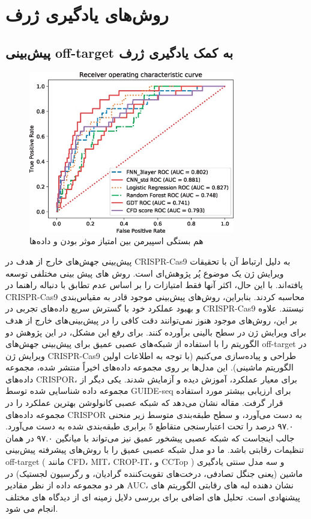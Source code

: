 \documentclass[12pt,a4paper,BCOR=.7cm,headsepline,bibliography=totoc]{report}
\begin{document}
\section{روش‌های یادگیری ژرف}
\subsection{پیش‌بینی off-target به کمک یادگیری ژرف}
\begin{figure}
\centering
\includegraphics[width=9cm, ]{pictures/DeepLearning.jpg}
\caption{
هم بستگی اسپیرمن بین امتیاز موثر بودن و داده‌ها ~\cite{chart}
}\label{wrap-fig:4}
\end{figure}
پیش‌بینی جهش‌های خارج از هدف در CRISPR-Cas9 به دلیل ارتباط آن با تحقیقات ویرایش ژن یک موضوع پُر پژوهش‌ای است. روش های پیش بینی مختلفی توسعه یافته‌اند. با این حال، اکثر آنها فقط امتیازات را بر اساس عدم تطابق با دنباله راهنما در CRISPR-Cas9 محاسبه کردند. بنابراین، روش‌های پیش‌بینی موجود قادر به مقیاس‌بندی و بهبود عملکرد خود با گسترش سریع داده‌های تجربی در CRISPR-Cas9 نیستند. علاوه بر این، روش‌های موجود هنوز نمی‌توانند دقت کافی را در پیش‌بینی‌های خارج از هدف برای ویرایش ژن در سطح بالینی برآورده کنند. برای رفع این مشکل، در این پژوهش دو الگوریتم را با استفاده از شبکه‌های عصبی عمیق برای پیش‌بینی جهش‌های off-target در ویرایش ژن CRISPR-Cas9 طراحی و پیاده‌سازی می‌کنیم (با توجه به اطلاعات اولین الگوریتم ماشینی). این مدل‌ها بر روی مجموعه داده‌های اخیراً منتشر شده، مجموعه داده‌های CRISPOR، برای معیار عملکرد، آموزش دیده و آزمایش شدند. یکی دیگر از مجموعه داده شناسایی شده توسط GUIDE-seq برای ارزیابی بیشتر مورد استفاده قرار گرفت. مقاله نشان می‌دهد که شبکه عصبی کانولوشن بهترین عملکرد را در مجموعه داده‌های CRISPOR به دست می‌آورد، و سطح طبقه‌بندی متوسط ​​زیر منحنی ۹۷.۰ درصد را تحت اعتبارسنجی متقاطع 5 برابری طبقه‌بندی شده به دست می‌آورد. جالب اینجاست که شبکه عصبی پیشخور عمیق نیز می‌تواند با میانگین ۹۷.۰ در همان تنظیمات رقابتی باشد. ما دو مدل شبکه عصبی عمیق را با روش‌های پیشرفته پیش‌بینی off-target ( مانند CFD، MIT، CROP-IT، و CCTop ) و سه مدل سنتی یادگیری ماشین (یعنی جنگل تصادفی، درخت‌های تقویت‌کننده گرادیان، و رگرسیون لجستیک) در هر دو مجموعه داده از نظر مقادیر AUC، نشان دهنده لبه های رقابتی الگوریتم های پیشنهادی است. تحلیل های اضافی برای بررسی دلایل زمینه ای از دیدگاه های مختلف انجام می شود.
\end{document}
